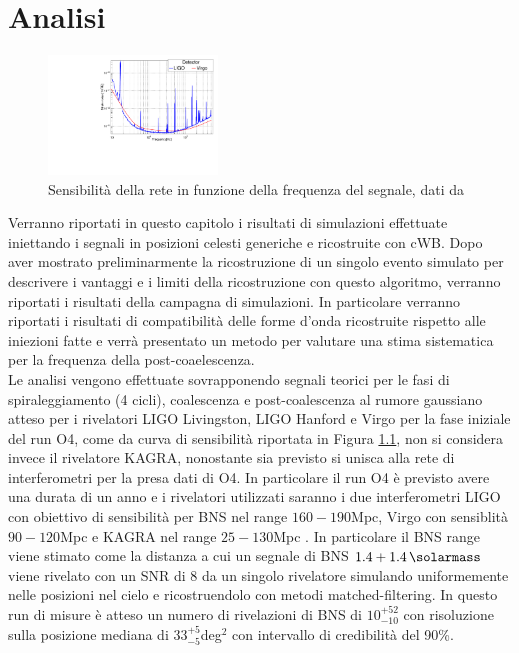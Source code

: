 \chapter{Analisi}
\label{chapter:analisi}
\begin{figure}
	\begin{center}
		\includegraphics[width=0.4\textwidth]{figures/Capitolo_3/report/pds.pdf}
	\end{center}
	\caption{Sensibilità della rete in funzione della frequenza del segnale, dati da \cite{curve_sens}}
	\label{fig:sensitivity_O4}
\end{figure}
Verranno riportati in questo capitolo i risultati di simulazioni effettuate iniettando i segnali in posizioni celesti generiche e ricostruite con cWB. Dopo aver mostrato preliminarmente la ricostruzione di un singolo evento simulato per descrivere i vantaggi e i limiti della ricostruzione con questo algoritmo, verranno riportati i risultati della campagna di simulazioni. In particolare verranno riportati i risultati di compatibilità delle forme d'onda ricostruite rispetto alle iniezioni fatte e verrà presentato un metodo per valutare una stima sistematica per la frequenza della post-coaelescenza.\\
Le analisi vengono effettuate sovrapponendo segnali teorici per le fasi di spiraleggiamento (4 cicli), coalescenza e post-coalescenza al rumore gaussiano atteso per i rivelatori LIGO Livingston, LIGO Hanford e Virgo per la fase iniziale del run O4, come da curva di sensibilità riportata in Figura \ref{fig:sensitivity_O4}, non si considera invece il rivelatore KAGRA, nonostante sia previsto si unisca alla rete di interferometri per la presa dati di O4. In particolare il run O4 è previsto avere una durata di un anno e i rivelatori utilizzati saranno i due interferometri LIGO con obiettivo di sensibilità per BNS nel range $160-190$Mpc, Virgo con sensiblità $90-120$Mpc e KAGRA nel range $25-130$Mpc \cite{Abbott_2020a}. In particolare il BNS range viene stimato come la distanza a cui un segnale di BNS $1.4+\SI{1.4}{\solarmass}$ viene rivelato con un SNR di 8 da un singolo rivelatore simulando uniformemente nelle posizioni nel cielo e ricostruendolo con metodi matched-filtering. In questo run di misure è atteso un numero di rivelazioni di BNS di $10^{+52}_{-10}$ con risoluzione sulla posizione mediana di $33_{-5}^{+5}$deg$^2$ con intervallo di credibilità del 90\%\cite{Abbott_2020a}.\\
